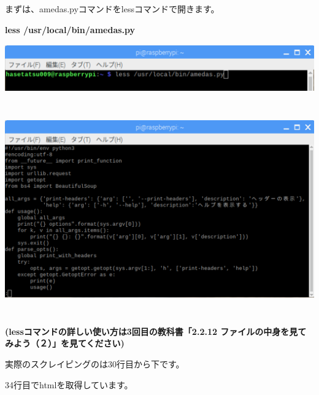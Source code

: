 まずは、amedas.pyコマンドをlessコマンドで開きます。


\bigskip

\textbf{less /usr/local/bin/amedas.py}



\begin{center}
  \includegraphics[width=17.006cm,height=2.067cm]{./text08-img/img00036.png}

\end{center}
\begin{center}
  \includegraphics[width=17.006cm,height=9.086cm]{./text08-img/img00037.png}

\end{center}
{\bfseries
(lessコマンドの詳しい使い方は3回目の教科書「2.2.12
ファイルの中身を見てみよう（２）」を見てください)%
}


\bigskip

\clearpage
実際のスクレイピングのは30行目から下です。

34行目でhtmlを取得しています。


